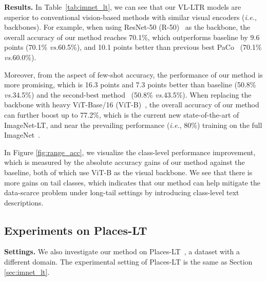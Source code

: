 \documentclass[runningheads]{llncs}
\def\vs{\emph{vs.}}
\def\ie{\emph{i.e.}}
\begin{document}
\noindent\textbf{Results.} In Table~\ref{tab:imnet_lt}, we can see that our VL-LTR models are superior to conventional
vision-based methods with similar visual encoders (\ie, backbones).
For example, when using ResNet-50 (R-50)~\cite{he2016deep} as the backbone, the overall accuracy of our method reaches 70.1\%, which outperforms baseline by 9.6 points (70.1\% \vs 60.5\%), and 10.1 points better than previous best PaCo~\cite{cui2021parametric} (70.1\% \vs 60.0\%).



Moreover, from the aspect of few-shot accuracy, the performance of our method is more promising, which is 16.3 points and 7.3 points better than baseline (50.8\% \vs 34.5\%) and the second-best method~\cite{zhang2021test} (50.8\% \vs 43.5\%).
When replacing the backbone with heavy ViT-Base/16 (ViT-B)~\cite{dosovitskiy2020image}, the overall accuracy of our method can further boost up to 77.2\%, which is the current new state-of-the-art of ImageNet-LT, and near the prevailing performance (\ie, 80\%) training on the full ImageNet~\cite{deng2009imagenet}.



In Figure \ref{fig:range_acc}, we visualize the class-level performance improvement, which is measured by the absolute accuracy gains of our method against the baseline, both of which use ViT-B as the visual backbone. We see that there is more gains on tail classes, which indicates that our method can help mitigate the data-scarce problem under long-tail settings by introducing class-level text descriptions.



\subsection{Experiments on Places-LT}
\noindent\textbf{Settings.} We also investigate our method on Places-LT~\cite{liu2019large}, a dataset with a different domain. The experimental setting of Places-LT is the same as Section \ref{sec:imnet_lt}.
\end{document}

